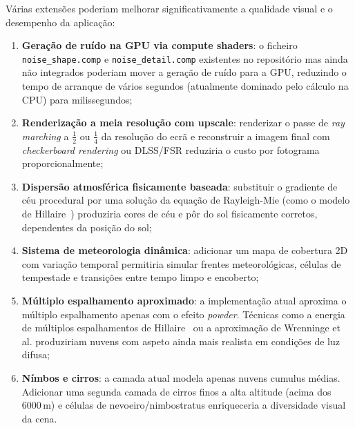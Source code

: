 Várias extensões poderiam melhorar significativamente a qualidade visual e o desempenho da aplicação:

\begin{enumerate}
    \item \textbf{Geração de ruído na GPU via compute shaders}: o ficheiro \texttt{noise\_shape.comp} e \texttt{noise\_detail.comp} existentes no repositório mas ainda não integrados poderiam mover a geração de ruído para a \ac{GPU}, reduzindo o tempo de arranque de vários segundos (atualmente dominado pelo cálculo na \ac{CPU}) para milissegundos;

    \item \textbf{Renderização a meia resolução com upscale}: renderizar o passe de \emph{ray marching} a $\frac{1}{2}$ ou $\frac{1}{4}$ da resolução do ecrã e reconstruir a imagem final com \emph{checkerboard rendering} ou DLSS/FSR reduziria o custo por fotograma proporcionalmente;

    \item \textbf{Dispersão atmosférica fisicamente baseada}: substituir o gradiente de céu procedural por uma solução da equação de Rayleigh-Mie (como o modelo de Hillaire~\cite{hillaire2020}) produziria cores de céu e pôr do sol fisicamente corretos, dependentes da posição do sol;

    \item \textbf{Sistema de meteorologia dinâmica}: adicionar um mapa de cobertura 2D com variação temporal permitiria simular frentes meteorológicas, células de tempestade e transições entre tempo limpo e encoberto;

    \item \textbf{Múltiplo espalhamento aproximado}: a implementação atual aproxima o múltiplo espalhamento apenas com o efeito \emph{powder}. Técnicas como a energia de múltiplos espalhamentos de Hillaire~\cite{hillaire2020} ou a aproximação de Wrenninge et al. produziriam nuvens com aspeto ainda mais realista em condições de luz difusa;

    \item \textbf{Nímbos e cirros}: a camada atual modela apenas nuvens cumulus médias. Adicionar uma segunda camada de cirros finos a alta altitude (acima dos 6000\,m) e células de nevoeiro/nimbostratus enriqueceria a diversidade visual da cena.
\end{enumerate}
